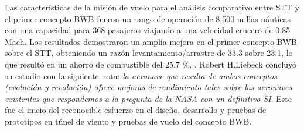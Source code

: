 Las características de la misión de vuelo para el análisis comparativo entre STT y el primer concepto BWB fueron un rango de operación de 8,500 millas náuticas con una capacidad para 368 pasajeros viajando a una velocidad crucero de 0.85 Mach.
Los resultados demostraron un amplia mejora en el primer concepto BWB sobre el STT, obteniendo un razón levantamiento/arrastre de 33.3 sobre 23.1, lo que resultó en un ahorro de combustible del 25.7 $\%$, \cite{Larrimer2020}.
%
Robert H.Liebeck concluyó su estudio con la siguiente nota: \textit{la aeronave que resulta de ambos conceptos (evolución y revolución) ofrece mejoras de rendimiento tales sobre las aeronaves existentes que respondemos a la pregunta de la NASA con un definitivo SI}.
%
Este fue el inicio del reconocible esfuerzo en el diseño, desarrollo y pruebas de prototipos en túnel de viento y pruebas de vuelo del concepto BWB.


%
%




